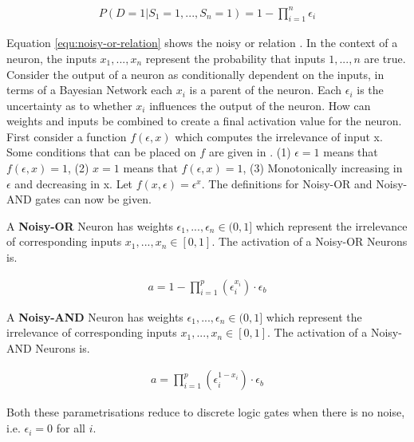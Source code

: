 \begin{align}
P(D = 1 | S_1 = 1, ..., S_n = 1) = 1 - \prod^n_{i=1} \epsilon_i
\label{equ:noisy-or-relation}
\end{align}

Equation \ref{equ:noisy-or-relation} shows the noisy or relation \cite{LearningLogicalActivations}. In the context of a neuron, the inputs $x_1, ..., x_n$ represent the probability that inputs $1, ..., n$ are true. Consider the output of a neuron as conditionally dependent on the inputs, in terms of a Bayesian Network each $x_i$ is a parent of the neuron. Each $\epsilon_i$ is the uncertainty as to whether $x_i$ influences the output of the neuron. How can weights and inputs be combined to create a final activation value for the neuron. First consider a function $f(\epsilon, x)$ which computes the irrelevance of input x. Some conditions that can be placed on $f$ are given in \cite{LearningLogicalActivations}. (1) $\epsilon = 1$ means that $f(\epsilon, x) = 1$, (2) $x = 1$ means that $f(\epsilon, x) = 1$, (3) Monotonically increasing in $\epsilon$ and decreasing in x. Let $f(x, \epsilon) = \epsilon^x$. The definitions for Noisy-OR and Noisy-AND gates can now be given.

\begin{definition}
	A \textbf{Noisy-OR} Neuron has weights $\epsilon_1, ..., \epsilon_n \in (0,1]$ which represent the irrelevance of corresponding inputs $x_1, ..., x_n \in [0,1]$. The activation of a Noisy-OR Neurons is.
	
	\begin{align}
	a = 1 - \prod^p_{i=1} (\epsilon_i^{x_i}) \cdot \epsilon_b
	\label{equ:noisy-or-activation-1}
	\end{align}
\end{definition}

\begin{definition}
	A \textbf{Noisy-AND} Neuron has weights $\epsilon_1, ..., \epsilon_n \in (0, 1]$ which represent the irrelevance of corresponding inputs $x_1, ..., x_n \in [0,1]$. The activation of a Noisy-AND Neurons is.
	
	\begin{align}
	a = \prod^p_{i=1} (\epsilon_i^{1 - x_i}) \cdot \epsilon_b
	\label{equ:noisy-and-activation-1}
	\end{align}
\end{definition}

Both these parametrisations reduce to discrete logic gates when there is no noise, i.e. $\epsilon_i = 0$ for all $i$.\\

